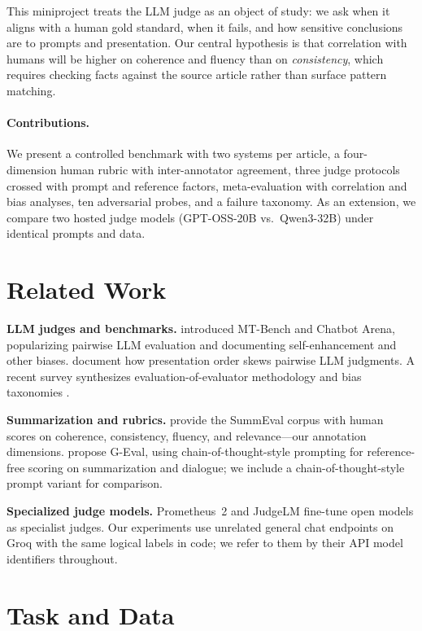\documentclass[11pt]{article}
\begin{document}
This miniproject treats the LLM judge as an object of study: we ask when it aligns with a human gold standard, when it fails, and how sensitive conclusions are to prompts and presentation. Our central hypothesis is that correlation with humans will be higher on coherence and fluency than on \emph{consistency}, which requires checking facts against the source article rather than surface pattern matching.

\paragraph{Contributions.}
We present a controlled benchmark with two systems per article, a four-dimension human rubric with inter-annotator agreement, three judge protocols crossed with prompt and reference factors, meta-evaluation with correlation and bias analyses, ten adversarial probes, and a failure taxonomy. As an extension, we compare two hosted judge models (GPT-OSS-20B vs.\ Qwen3-32B) under identical prompts and data.

\section{Related Work}

\textbf{LLM judges and benchmarks.}
\citet{zheng2023judging} introduced MT-Bench and Chatbot Arena, popularizing pairwise LLM evaluation and documenting self-enhancement and other biases. \citet{wang2024largebench} document how presentation order skews pairwise LLM judgments. A recent survey synthesizes evaluation-of-evaluator methodology and bias taxonomies \citep{gu2024survey}.

\textbf{Summarization and rubrics.}
\citet{fabbri2021summeval} provide the SummEval corpus with human scores on coherence, consistency, fluency, and relevance---our annotation dimensions. \citet{liu2023geval} propose G-Eval, using chain-of-thought-style prompting for reference-free scoring on summarization and dialogue; we include a chain-of-thought-style prompt variant for comparison.

\textbf{Specialized judge models.}
Prometheus~2 \citep{kim2024prometheus2} and JudgeLM \citep{zhu2024judgelm} fine-tune open models as specialist judges. Our experiments use unrelated general chat endpoints on Groq with the same logical labels in code; we refer to them by their API model identifiers throughout.

\section{Task and Data}
\end{document}
